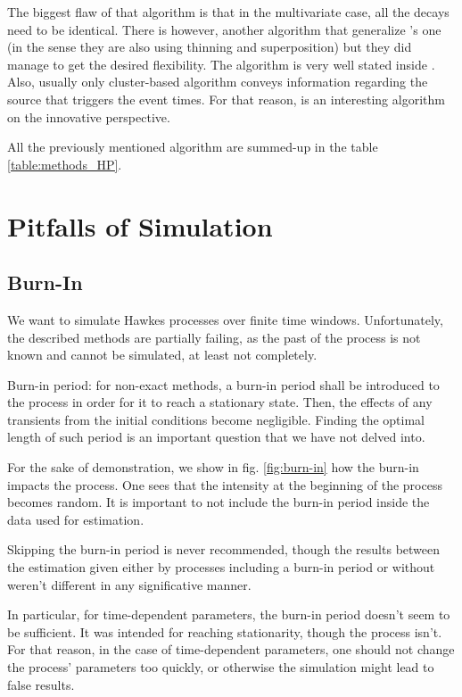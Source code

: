 The biggest flaw of that algorithm is that in the multivariate case, all the decays need to be identical. There is however, another algorithm that generalize \cite{simuldassios}'s one (in the sense they are also using thinning and superposition) but they did manage to get the desired flexibility. The algorithm is very well stated inside \cite{my_algo_simul}. Also, usually only cluster-based algorithm conveys information regarding the source that triggers the event times. For that reason, \cite{my_algo_simul} is an interesting algorithm on the innovative perspective.



All the previously mentioned algorithm are summed-up in the table \ref{table:methods_HP}.


\section{Pitfalls of Simulation}
\subsection{Burn-In}
\label{subsection:burn}
We want to simulate Hawkes processes over finite time windows. Unfortunately, the described methods are partially failing, as the past of the process is not known and cannot be simulated, at least not completely.

Burn-in period: for non-exact methods, a burn-in period shall be introduced to the process in order for it to reach a stationary state. Then, the effects of any transients from the initial conditions become negligible. Finding the optimal length of such period is an important question that we have not delved into.


For the sake of demonstration, we show in fig. \ref{fig:burn-in} how the burn-in impacts the process. One sees that the intensity at the beginning of the process becomes random. It is important to not include the burn-in period inside the data used for estimation. 

\begin{remarque}
Skipping the burn-in period is never recommended, though the results between the estimation given either by processes including a burn-in period or without weren't different in any significative manner.
\end{remarque}

In particular, for time-dependent parameters, the burn-in period doesn't seem to be sufficient. It was intended for reaching stationarity, though the process isn't. For that reason, in the case of time-dependent parameters, one should not change the process' parameters too quickly, or otherwise the simulation might lead to false results.

